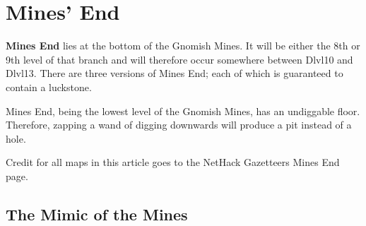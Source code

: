 \section{Mines' End}
\textbf{Mines\textquotesingle{} End} lies at the bottom of the Gnomish Mines. It will be either the 8th or 9th level of that branch and will therefore occur somewhere between Dlvl10 and Dlvl13. There are three versions of Mines\textquotesingle{} End; each of which is guaranteed to contain a luckstone.

Mines\textquotesingle{} End, being the lowest level of the Gnomish Mines, has an undiggable floor. Therefore, zapping a wand of digging downwards will produce a pit instead of a hole.

Credit for all maps in this article goes to the NetHack Gazetteer\textquotesingle{}s Mines\textquotesingle{} End page.

\subsection{The Mimic of the Mines}

